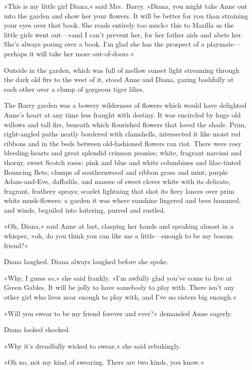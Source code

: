 »This is my little girl Diana,« said Mrs.~Barry. »Diana, you might take Anne out into the garden and show her your flowers. It will be better for you than straining your eyes over that book. She reads entirely too much\longdash« this to Marilla as the little girls went out—»and I can't prevent her, for her father aids and abets her. She's always poring over a book. I'm glad she has the prospect of a playmate—perhaps it will take her more out-of-doors.«

Outside in the garden, which was full of mellow sunset light streaming through the dark old firs to the west of it, stood Anne and Diana, gazing bashfully at each other over a clump of gorgeous tiger lilies.

The Barry garden was a bowery wilderness of flowers which would have delighted Anne's heart at any time less fraught with destiny. It was encircled by huge old willows and tall firs, beneath which flourished flowers that loved the shade. Prim, right-angled paths neatly bordered with clamshells, intersected it like moist red ribbons and in the beds between old-fashioned flowers ran riot. There were rosy bleeding-hearts and great splendid crimson peonies; white, fragrant narcissi and thorny, sweet Scotch roses; pink and blue and white columbines and lilac-tinted Bouncing Bets; clumps of southernwood and ribbon grass and mint; purple Adam-and-Eve, daffodils, and masses of sweet clover white with its delicate, fragrant, feathery sprays; scarlet lightning that shot its fiery lances over prim white musk-flowers; a garden it was where sunshine lingered and bees hummed, and winds, beguiled into loitering, purred and rustled.

»Oh, Diana,« said Anne at last, clasping her hands and speaking almost in a whisper, »oh, do you think you can like me a little—enough to be my bosom friend?«

Diana laughed. Diana always laughed before she spoke.

»Why, I guess so,« she said frankly. »I'm awfully glad you've come to live at Green Gables. It will be jolly to have somebody to play with. There isn't any other girl who lives near enough to play with, and I've no sisters big enough.«

»Will you swear to be my friend forever and ever?« demanded Anne eagerly.

Diana looked shocked.

»Why it's dreadfully wicked to swear,« she said rebukingly.

»Oh no, not my kind of swearing. There are two kinds, you know.«

